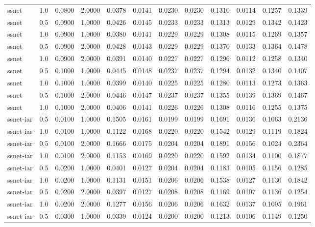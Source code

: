 \documentclass[
]{article}
\begin{document}
\begin{longtable}[]{@{}lrrrrrrrrrrr@{}}
ssnet & 1.0 & 0.0800 & 2.0000 & 0.0378 & 0.0141 & 0.0230 & 0.0230 &
0.1310 & 0.0114 & 0.1257 & 0.1339 \\
ssnet & 0.5 & 0.0900 & 1.0000 & 0.0426 & 0.0145 & 0.0233 & 0.0233 &
0.1313 & 0.0129 & 0.1342 & 0.1423 \\
ssnet & 1.0 & 0.0900 & 1.0000 & 0.0380 & 0.0141 & 0.0229 & 0.0229 &
0.1308 & 0.0115 & 0.1269 & 0.1357 \\
ssnet & 0.5 & 0.0900 & 2.0000 & 0.0428 & 0.0143 & 0.0229 & 0.0229 &
0.1370 & 0.0133 & 0.1364 & 0.1478 \\
ssnet & 1.0 & 0.0900 & 2.0000 & 0.0391 & 0.0140 & 0.0227 & 0.0227 &
0.1296 & 0.0112 & 0.1258 & 0.1340 \\
ssnet & 0.5 & 0.1000 & 1.0000 & 0.0445 & 0.0148 & 0.0237 & 0.0237 &
0.1294 & 0.0132 & 0.1340 & 0.1407 \\
ssnet & 1.0 & 0.1000 & 1.0000 & 0.0399 & 0.0140 & 0.0225 & 0.0225 &
0.1280 & 0.0113 & 0.1273 & 0.1363 \\
ssnet & 0.5 & 0.1000 & 2.0000 & 0.0446 & 0.0147 & 0.0237 & 0.0237 &
0.1355 & 0.0139 & 0.1369 & 0.1467 \\
ssnet & 1.0 & 0.1000 & 2.0000 & 0.0406 & 0.0141 & 0.0226 & 0.0226 &
0.1308 & 0.0116 & 0.1255 & 0.1375 \\
ssnet-iar & 0.5 & 0.0100 & 1.0000 & 0.1505 & 0.0161 & 0.0199 & 0.0199 &
0.1691 & 0.0136 & 0.1063 & 0.2136 \\
ssnet-iar & 1.0 & 0.0100 & 1.0000 & 0.1122 & 0.0168 & 0.0220 & 0.0220 &
0.1542 & 0.0129 & 0.1119 & 0.1824 \\
ssnet-iar & 0.5 & 0.0100 & 2.0000 & 0.1666 & 0.0175 & 0.0204 & 0.0204 &
0.1891 & 0.0156 & 0.1024 & 0.2364 \\
ssnet-iar & 1.0 & 0.0100 & 2.0000 & 0.1153 & 0.0169 & 0.0220 & 0.0220 &
0.1592 & 0.0134 & 0.1100 & 0.1877 \\
ssnet-iar & 0.5 & 0.0200 & 1.0000 & 0.0401 & 0.0127 & 0.0204 & 0.0204 &
0.1183 & 0.0105 & 0.1156 & 0.1285 \\
ssnet-iar & 1.0 & 0.0200 & 1.0000 & 0.1131 & 0.0151 & 0.0206 & 0.0206 &
0.1538 & 0.0127 & 0.1130 & 0.1842 \\
ssnet-iar & 0.5 & 0.0200 & 2.0000 & 0.0397 & 0.0127 & 0.0208 & 0.0208 &
0.1169 & 0.0107 & 0.1136 & 0.1254 \\
ssnet-iar & 1.0 & 0.0200 & 2.0000 & 0.1277 & 0.0156 & 0.0206 & 0.0206 &
0.1632 & 0.0137 & 0.1095 & 0.1961 \\
ssnet-iar & 0.5 & 0.0300 & 1.0000 & 0.0339 & 0.0124 & 0.0200 & 0.0200 &
0.1213 & 0.0106 & 0.1149 & 0.1250 \\

\end{longtable}
\end{document}
